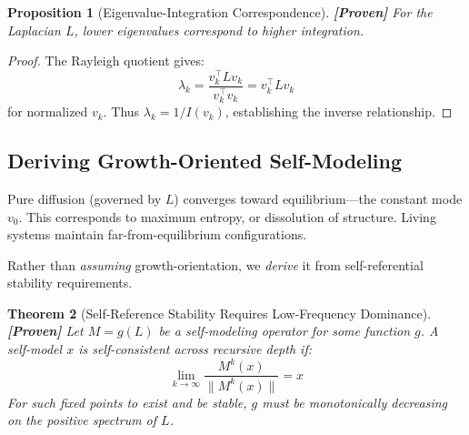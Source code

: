 \documentclass[11pt]{article}
\newtheorem{theorem}{Theorem}[section]
\newtheorem{proposition}[theorem]{Proposition}
\theoremstyle{definition}
\theoremstyle{remark}
\begin{document}
\begin{proposition}[Eigenvalue-Integration Correspondence]\label{prop:eigen_int}
\textbf{[Proven]} For the Laplacian $L$, lower eigenvalues correspond to higher integration.
\end{proposition}

\begin{proof}
The Rayleigh quotient gives:
\[
\lambda_k = \frac{v_k^\top L v_k}{v_k^\top v_k} = v_k^\top L v_k
\]
for normalized $v_k$. Thus $\lambda_k = 1/I(v_k)$, establishing the inverse relationship.
\end{proof}

\subsection{Deriving Growth-Oriented Self-Modeling}

Pure diffusion (governed by $L$) converges toward equilibrium---the constant mode $v_0$. This corresponds to maximum entropy, or dissolution of structure. Living systems maintain far-from-equilibrium configurations.

Rather than \emph{assuming} growth-orientation, we \emph{derive} it from self-referential stability requirements.

\begin{theorem}[Self-Reference Stability Requires Low-Frequency Dominance]\label{thm:growth_necessity}
\textbf{[Proven]} Let $M = g(L)$ be a self-modeling operator for some function $g$. A self-model $x$ is \emph{self-consistent across recursive depth} if:
\[
\lim_{k \to \infty} \frac{M^k(x)}{\|M^k(x)\|} = x
\]
For such fixed points to exist and be stable, $g$ must be monotonically decreasing on the positive spectrum of $L$.
\end{theorem}
\end{document}
